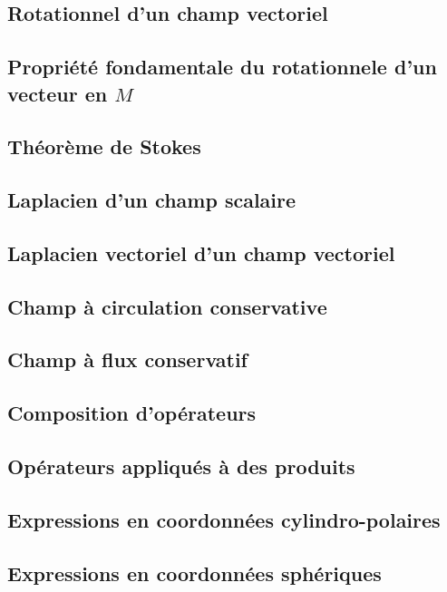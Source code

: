 \documentclass[lecture.tex]{subfiles}
\begin{document}
\subsection{Rotationnel d'un champ vectoriel}

\subsection{Propriété fondamentale du rotationnele d'un vecteur en $M$}

\subsection{Théorème de Stokes}

\subsection{Laplacien d'un champ scalaire}

\subsection{Laplacien vectoriel d'un champ vectoriel}

\subsection{Champ à circulation conservative}

\subsection{Champ à flux conservatif}

\subsection{Composition d'opérateurs}

\subsection{Opérateurs appliqués à des produits}

\subsection{Expressions en coordonnées cylindro-polaires}

\subsection{Expressions en coordonnées sphériques}
\end{document}
